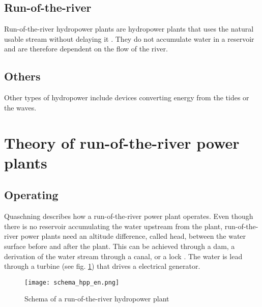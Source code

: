\subsection{Run-of-the-river}

Run-of-the-river hydropower plants are hydropower plants that uses the natural usable stream without delaying it \cite{vgb}. They do not accumulate water in a reservoir and are therefore dependent on the flow of the river.

\subsection{Others}

Other types of hydropower include devices converting energy from the tides or the waves.

\section{Theory of run-of-the-river power plants}
\subsection{Operating}
Quaschning \cite{quaschning} describes how a run-of-the-river power plant operates. Even though there is no reservoir accumulating the water upstream from the plant, run-of-the-river power plants need an altitude difference, called head, between the water surface before and after the plant. This can be achieved through a dam, a derivation of the water stream through a canal, or a lock \cite{tdi_petites_centrales}. The water is lead through a turbine (see fig. \ref{schema_hpp}) that drives a electrical generator.
\begin{figure}[H]
\texttt{[image: schema\_hpp\_en.png]}
\caption[Schema of a run-of-the-river hydropower plant]{Schema of a run-of-the-river hydropower plant \cite{quaschning}}
\centering
\label{schema_hpp}
\end{figure}
